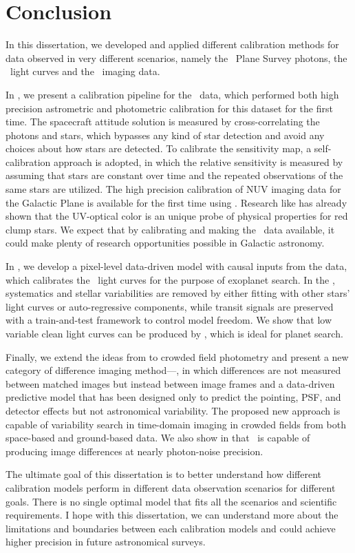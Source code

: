 \chapter*{Conclusion}

In this dissertation, we developed and applied different calibration methods for data observed in very different scenarios, namely the \galex\ Plane Survey photons, the \kepler\ light curves and the \KTCN\ imaging data.

In , we present a calibration pipeline for the \cause\ data, which performed both high precision astrometric and photometric calibration for this dataset for the first time.
The spacecraft attitude solution is measured by cross-correlating the photons and stars, which bypasses any kind of star detection and avoid any choices about how stars are detected.
To calibrate the sensitivity map, a self-calibration approach is adopted, in which the relative sensitivity is measured by assuming that stars are constant over time and the repeated observations of the same stars are utilized.
The high precision calibration of NUV imaging data for the Galactic Plane is available for the first time using \galex. 
Research like \cite{redclump} has already shown that the UV-optical color is an unique probe of physical properties for red clump stars.
We expect that by calibrating and making the \cause\ data available, it could make plenty of research opportunities possible in Galactic astronomy.

In , we develop a pixel-level data-driven model with causal inputs from the data, which calibrates the \kepler\ light curves for the purpose of exoplanet search.
In the \cpm, systematics and stellar variabilities are removed by either fitting with other stars' light curves or auto-regressive components, while transit signals are preserved with a train-and-test framework to control model freedom.
We show that low variable clean light curves can be produced by \cpm, which is ideal for planet search.

Finally, we extend the ideas from  to crowded field photometry and present a new category of difference imaging method---\cpmdiff, in which differences are not measured between matched images but instead between image frames and a data-driven predictive model that has been designed only to predict the pointing, PSF, and detector effects but not astronomical variability.
The proposed new approach is capable of variability search in time-domain imaging in crowded fields from both space-based and ground-based data.
We also show in  that \cpmdiff\ is capable of producing image differences at nearly photon-noise precision. 

The ultimate goal of this dissertation is to better understand how different calibration models perform in different data observation scenarios for different goals.
There is no single optimal model that fits all the scenarios and scientific requirements.
I hope with this dissertation, we can understand more about the limitations and boundaries between each calibration models and could achieve higher precision in future astronomical surveys.

